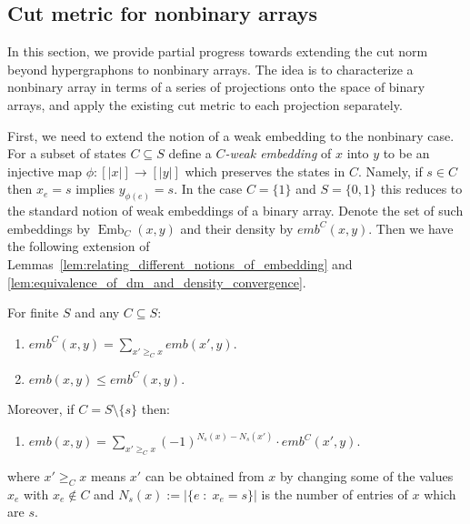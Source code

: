 \begin{subappendices}
\newpage
\subsection{Cut metric for nonbinary arrays}

In this section, we provide partial progress towards extending the cut norm beyond hypergraphons
to nonbinary arrays. The idea is to characterize a nonbinary array in terms of a series of projections onto
the space of binary arrays, and apply the existing cut metric to each projection separately.

First, we need to extend the notion of a weak embedding to the nonbinary case. For a subset of states
 $C \subseteq S$ define a \textit{$C$-weak embedding} of $x$ into $y$ to be an injective map
 $\phi: [|x|] \to [|y|]$ which preserves the states in $C$. Namely, if $s \in C$ then $x_e = s$
 implies $y_{\phi(e)} = s$. In the case $C = \{1\}$ and $S = \{0,1\}$ this reduces to the standard
  notion of weak embeddings of a binary array. Denote the set of such embeddings by
  $\operatorname{Emb}_C(x,y)$ and their density by $emb^C(x,y)$. Then we have the following extension
  of Lemmas~\ref{lem:relating_different_notions_of_embedding} and
  \ref{lem:equivalence_of_dm_and_density_convergence}.

\begin{lemma}
\label{lem:weak_embeddings_for_nonbinary_arrays}
    For finite $S$ and any $C \subseteq S$:

    \begin{enumerate}[label=(\roman*)]
        \item $emb^C(x,y) = \sum_{x' \geq_C x} emb(x', y)$.

        \item $emb(x,y) \leq emb^C(x,y)$.
    \end{enumerate}

    \noindent Moreover, if $C = S \setminus \{s\}$ then:

    \begin{enumerate}
        \item[(iii)] $emb(x,y) = \sum_{x' \geq_C x} (-1)^{N_s(x)-N_s(x')} \cdot emb^C(x', y)$.
    \end{enumerate}


    \noindent where $x' \geq_C x$ means $x'$ can be obtained from $x$ by changing some of the values $x_e$ with $x_e \notin C$ and $N_s(x) := | \{e \; : \; x_e = s\} |$ is the number of entries of $x$ which are $s$.


\end{lemma}
\end{subappendices}
